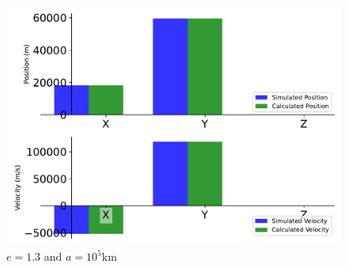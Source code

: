 \begin{figure}[htbp]\centerline{\includegraphics[height=0.7\textwidth, keepaspectratio]{AutoTeX/EquHyp_a_2}}\caption{$e = 1.3$ and $a = 10^5$km}\label{fig:EquHyp_a_2}\end{figure}